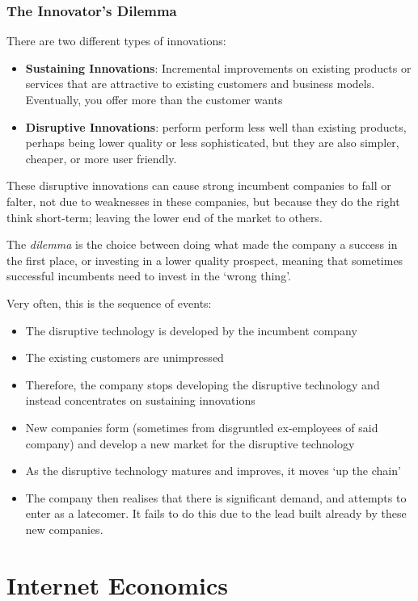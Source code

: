 \documentclass[11pt,a4paper,titlepage,dvipsnames,cmyk]{scrartcl}
\begin{document}
\subsubsection{The Innovator's Dilemma}
There are two different types of innovations:
\begin{itemize}
    \item \textbf{Sustaining Innovations}: Incremental improvements on existing products or services that are attractive to existing customers and business models. Eventually, you offer more than the customer wants
    \item \textbf{Disruptive Innovations}: perform perform less well than existing products, perhaps being lower quality or less sophisticated, but they are also simpler, cheaper, or more user friendly.
\end{itemize}

These disruptive innovations can cause strong incumbent companies to fall or falter, not due to weaknesses in these companies, but because they do the right think short-term; leaving the lower end of the market to others.

The \textit{dilemma} is the choice between doing what made the company a success in the first place, or investing in a lower quality prospect, meaning that sometimes successful incumbents need to invest in the `wrong thing'.

Very often, this is the sequence of events:
\begin{itemize}
    \item The disruptive technology is developed by the incumbent company
    \item The existing customers are unimpressed
    \item Therefore, the company stops developing the disruptive technology and instead concentrates on sustaining innovations
    \item New companies form (sometimes from disgruntled ex-employees of said company) and develop a new market for the disruptive technology
    \item As the disruptive technology matures and improves, it moves `up the chain'
    \item The company then realises that there is significant demand, and attempts to enter as a latecomer. It fails to do this due to the lead built already by these new companies.
\end{itemize}

\section{Internet Economics}
\end{document}
